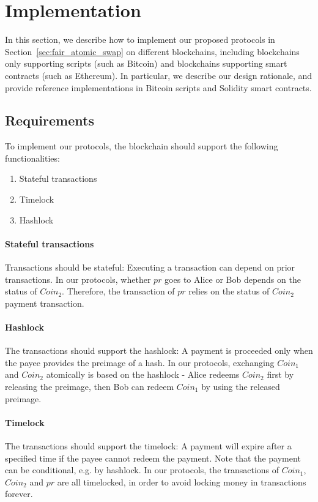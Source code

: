 \section{Implementation}
\label{sec:implementation}

In this section, we describe how to implement our proposed protocols in Section~\ref{sec:fair_atomic_swap} on different blockchains, including blockchains only supporting scripts (such as Bitcoin) and blockchains supporting smart contracts (such as Ethereum).
In particular, we describe our design rationale, and provide reference implementations in Bitcoin scripts and Solidity smart contracts.

\subsection{Requirements}

To implement our protocols, the blockchain should support the following functionalities:

\begin{enumerate}
    \item Stateful transactions
    \item Timelock
    \item Hashlock
\end{enumerate}

\paragraph{Stateful transactions}
Transactions should be stateful: Executing a transaction can depend on prior transactions.
In our protocols, whether $pr$ goes to Alice or Bob depends on the status of $Coin_2$.
Therefore, the transaction of $pr$ relies on the status of $Coin_2$ payment transaction.

\paragraph{Hashlock}
The transactions should support the hashlock: A payment is proceeded only when the payee provides the preimage of a hash.
In our protocols, exchanging $Coin_1$ and $Coin_2$ atomically is based on the hashlock -
Alice redeems $Coin_2$ first by releasing the preimage, then Bob can redeem $Coin_1$ by using the released preimage.

\paragraph{Timelock}
The transactions should support the timelock: A payment will expire after a specified time if the payee cannot redeem the payment.
Note that the payment can be conditional, e.g. by hashlock.
In our protocols, the transactions of $Coin_1$, $Coin_2$ and $pr$ are all timelocked, in order to avoid locking money in transactions forever.

